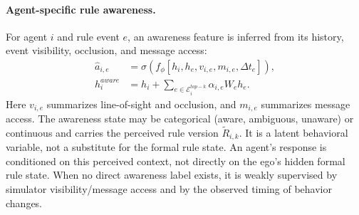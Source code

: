 \documentclass[letterpaper]{article} %
\begin{document}
\paragraph{Agent-specific rule awareness.}
For agent $i$ and rule event $e$, an awareness feature is inferred from its history, event visibility, occlusion, and message access:
\begin{equation}
\begin{aligned}
\hat a_{i,e}&=\sigma\!\left(f_\phi[h_i,h_e,v_{i,e},m_{i,e},\Delta t_e]\right),\\
h_i^{aware}&=h_i+\sum_{e\in\mathcal E_i^{top-k}}\alpha_{i,e}W_eh_e.
\end{aligned}
\label{eq:awareness}
\end{equation}
Here $v_{i,e}$ summarizes line-of-sight and occlusion, and $m_{i,e}$ summarizes message access. The awareness state may be categorical (aware, ambiguous, unaware) or continuous and carries the perceived rule version $\widetilde R_{i,k}$. It is a latent behavioral variable, not a substitute for the formal rule state. An agent's response is conditioned on this perceived context, not directly on the ego's hidden formal rule state. When no direct awareness label exists, it is weakly supervised by simulator visibility/message access and by the observed timing of behavior changes.
\end{document}
